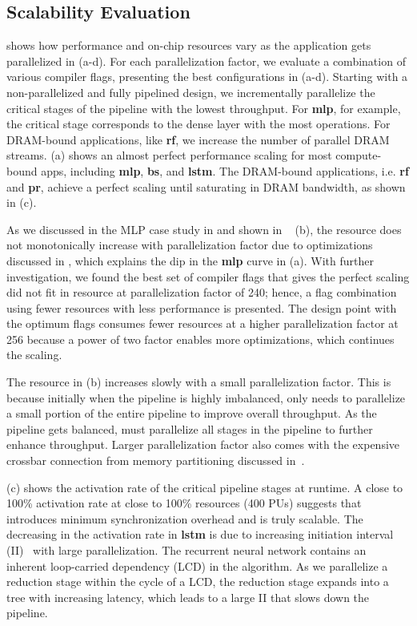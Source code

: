 \subsection{Scalability Evaluation}
 shows how performance and on-chip resources vary as the application gets parallelized in
(a-d). 
For each parallelization factor, we evaluate a combination of various compiler flags, presenting the
best configurations in (a-d).
Starting with a non-parallelized and fully pipelined design, 
we incrementally parallelize the critical stages of the pipeline with the lowest throughput.
For \textbf{mlp}, for example, the critical stage corresponds to the dense layer with the most operations.
For DRAM-bound applications, like \textbf{rf}, we increase the number of parallel DRAM streams.
 (a) shows an almost perfect performance scaling for most compute-bound apps, including
\textbf{mlp}, \textbf{bs}, and \textbf{lstm}.
The DRAM-bound applications, i.e. \textbf{rf} and \textbf{pr}, achieve a perfect scaling until
saturating in DRAM bandwidth, as shown in (c).

As we discussed in the MLP case study in  and shown in ~ (b), the resource does not
monotonically increase with parallelization factor due to optimizations discussed in ,
which explains the dip in the \textbf{mlp} curve in (a). 
With further investigation, we found the best set of compiler flags that gives the perfect scaling 
did not fit in resource at parallelization factor of 240; hence, a flag combination using fewer
resources with less performance is presented. 
The design point with the optimum flags consumes fewer resources at a higher parallelization factor at 256
because a power of two factor enables more optimizations, which continues the scaling.

The resource in (b) increases slowly with a small parallelization factor. This is because initially
when the pipeline is highly imbalanced, \name only needs to parallelize a small portion of the
entire pipeline to improve overall throughput. As the pipeline gets balanced, \name must parallelize
all stages in the pipeline to further enhance throughput. Larger parallelization factor also comes
with the expensive crossbar connection from memory partitioning discussed in~.

 (c) shows the activation rate of the critical pipeline stages at runtime.
A close to 100\% activation rate at close to 100\% resources (400 PUs) suggests that 
\name introduces minimum synchronization overhead and is truly scalable.
The decreasing in the activation rate in \textbf{lstm} is due to increasing initiation interval
(II)~\cite{II} with large parallelization.
The recurrent neural network contains an inherent loop-carried dependency (LCD) in the algorithm. 
As we parallelize a reduction stage within the cycle of a LCD, the reduction stage expands into a
tree with increasing latency, which leads to a large II that slows down the pipeline.

